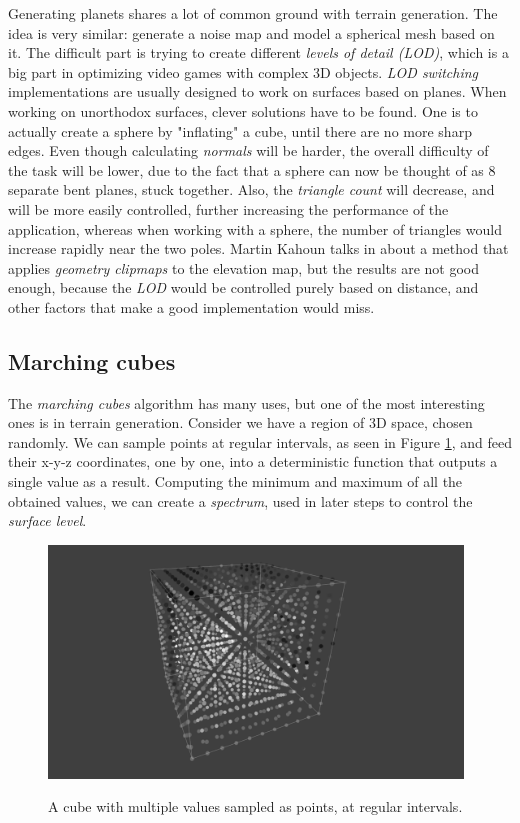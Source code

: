 Generating planets shares a lot of common ground with terrain generation. The idea is very similar: generate a noise map and model a spherical mesh based on it. The difficult part is trying to create different \textit{levels of detail (LOD)}, which is a big part in optimizing video games with complex 3D objects. \textit{LOD switching} implementations are usually designed to work on surfaces based on planes. When working on unorthodox surfaces, clever solutions have to be found. One is to actually create a sphere by "inflating" a cube, until there are no more sharp edges. Even though calculating \textit{normals} will be harder, the overall difficulty of the task will be lower, due to the fact that a sphere can now be thought of as 8 separate bent planes, stuck together. Also, the \textit{triangle count} will decrease, and will be more easily controlled, further increasing the performance of the application, whereas when working with a sphere, the number of triangles would increase rapidly near the two poles. Martin Kahoun talks in \cite{kahoun2010procedural} about a method that applies \textit{geometry clipmaps} to the elevation map, but the results are not good enough, because the \textit{LOD} would be controlled purely based on distance, and other factors that make a good implementation would miss.

\subsection{Marching cubes}

The \textit{marching cubes} algorithm has many uses, but one of the most interesting ones is in terrain generation. Consider we have a region of 3D space, chosen randomly. We can sample points at regular intervals, as seen in Figure \ref{fig:marchingCubes}, and feed their x-y-z coordinates, one by one, into a deterministic function that outputs a single value as a result. Computing the minimum and maximum of all the obtained values, we can create a \textit{spectrum}, used in later steps to control the \textit{surface level}.  

\begin{figure}[htp]
    \centering
    \includegraphics[width = 11cm]{figures/marchingCubes.png}
    \caption{A cube with multiple values sampled as points, at regular intervals.}
    \cite{marchingCubes}
    \label{fig:marchingCubes}
\end{figure}

